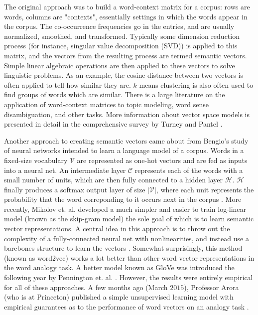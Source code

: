 \documentclass[12pt, usenames]{article}
\theoremstyle{definition}
\theoremstyle{definition}
\theoremstyle{definition}
\newcommand{\mc}[1]
{\mathcal{#1}}
\begin{document}
The original approach was to build a word-context matrix for a corpus: rows are words, columns are "contexts", essentially settings in which the words appear in the corpus. The co-occurrence frequencies go in the entries, and are usually normalized, smoothed, and transformed. Typically some dimension reduction process (for instance, singular value decomposition (SVD)) is applied to this matrix, and the vectors from the resulting process are termed semantic vectors. Simple linear algebraic operations are then applied to these vectors to solve linguistic problems. As an example, the cosine distance between two vectors is often applied to tell how similar they are. $k$-means clustering is also often used to find groups of words which are similar. There is a large literature on the application of word-context matrices to topic modeling, word sense disambiguation, and other tasks. More information about vector space models is presented in detail in the comprehensive survey by Turney and Pantel \cite{Turney}. 

Another approach to creating semantic vectors came about from Bengio's study of neural networks intended to learn a language model of a corpus. Words in a fixed-size vocabulary $\mc{V}$ are represented as one-hot vectors and are fed as inputs into a neural net. An intermediate layer $\mc{C}$ represents each of the words with a small number of units, which are then fully connected to a hidden layer $\mc{H}$. $\mc{H}$ finally produces a softmax output layer of size $|\mc{V}|$, where each unit represents the probability that the word correponding to it occurs next in the corpus \cite{Bengio}.
More recently, Mikolov et. al. developed a much simpler and easier to train log-linear model (known as the skip-gram model) the sole goal of which is to learn semantic vector representations. A central idea in this approach is to throw out the complexity of a fully-connected neural net with nonlinearities, and instead use a barebones structure to learn the vectors \cite{Mikolov}. Somewhat surprisingly, this method (known as word$2$vec) works a lot better than other word vector representations in the word analogy task. A better model known as GloVe was introduced the following year by Pennington et. al. \cite{Pennington}. However, the results were entirely empirical for all of these approaches. A few months ago (March $2015$), Professor Arora (who is at Princeton) published a simple unsupervised learning model with empirical guarantees as to the performance of word vectors on an analogy task \cite{Arora}. 
\end{document}
